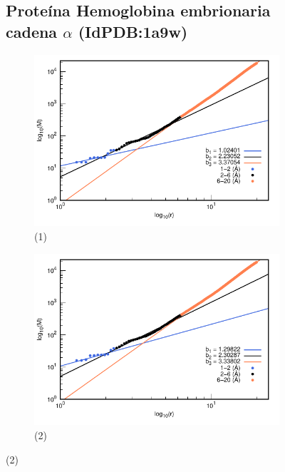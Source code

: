 \begin{figure}[H]
	\subsection*{Proteína Hemoglobina embrionaria cadena $\alpha$ (IdPDB:1a9w)}
	
	\hspace{-0.3cm} 
	\begin{subfigure}{0.49\textwidth}
		\centering
		\includegraphics[width=\linewidth,page=1]{graphs/PDBs/1a9w/1a9waddH.pdf}
		\caption{(1)}
	\end{subfigure}
	\hspace{0.2cm}
	\begin{subfigure}{0.49\textwidth}
		\centering
		\includegraphics[width=\linewidth,page=1]{graphs/PDBs/1a9w/1a9wEm.pdf}
		\caption{(2)}
	\end{subfigure}
	

\end{figure}

